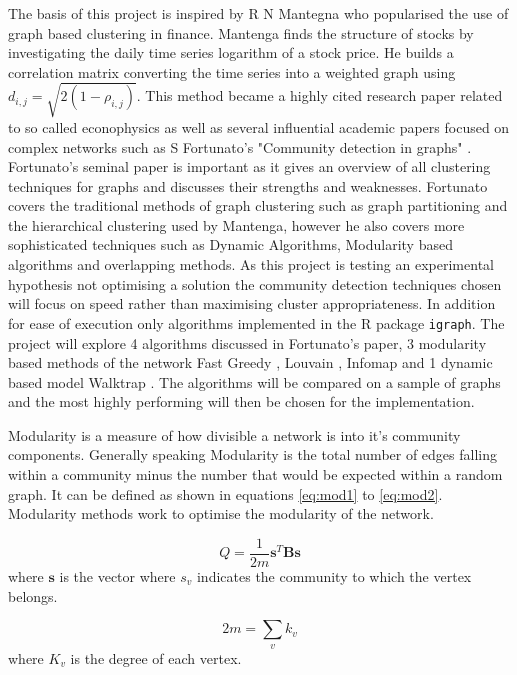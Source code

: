 The basis of this project is inspired by R N Mantegna  \cite{mantegna1999} who popularised the use of graph based clustering in finance. Mantenga finds the structure of stocks by investigating the daily time series logarithm of a stock price. He builds a correlation matrix converting the time series into a weighted graph using $d_{i,j}= \sqrt{2(1-\rho_{i,j})}$. This method became a highly cited research paper related to so called econophysics as well as several influential academic papers focused on complex networks such as S Fortunato's "Community detection in graphs" \cite{fortunato2010}. 
Fortunato's seminal paper is important as it gives an overview of all clustering techniques for graphs and discusses their strengths and weaknesses. Fortunato covers the traditional methods of graph clustering such as graph partitioning and the hierarchical clustering used by Mantenga, however he also covers more sophisticated techniques such as Dynamic Algorithms, Modularity based algorithms and overlapping methods. As this project is testing an experimental hypothesis not optimising a solution the community detection techniques chosen will focus on speed rather than  maximising cluster appropriateness. In addition for ease of execution only algorithms implemented in the R package \texttt{igraph}. The project will explore 4 algorithms discussed in Fortunato's paper, 3 modularity based methods of the network Fast Greedy \cite{clauset2004}, Louvain \cite{blondel2008}, Infomap \cite{rosvall2008} and 1 dynamic based model Walktrap \cite{pons2006}. The algorithms will be compared on a sample of graphs and the most highly performing will then be chosen for the implementation.

Modularity \cite{newman2006} is a measure of how divisible a network is into it's community components. Generally speaking Modularity is the total number of edges falling within a community minus the number that would be expected within a random graph. It can be defined as shown in equations \ref{eq:mod1} to \ref{eq:mod2}. Modularity methods work to optimise the modularity of the network.

\begin{equation}
\label{eq:mod1}
    Q=\frac{1}{2m}\mathbf{s}^T\mathbf{Bs}
\end{equation}
where $\mathbf{s}$ is the vector where $s_v$ indicates the community to which the vertex belongs.

\begin{equation}
    2m=\sum_v k_v
\end{equation}
where $K_v$ is the degree of each vertex.

